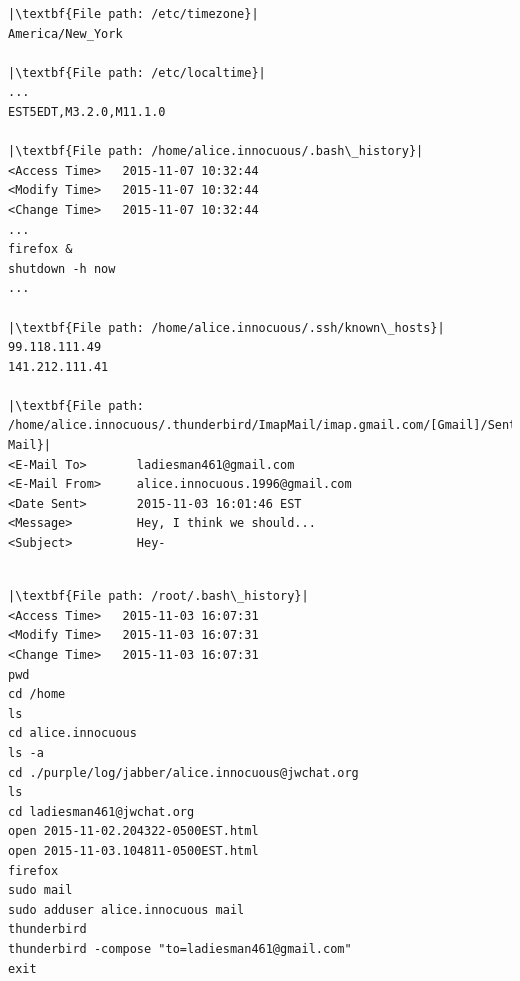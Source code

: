 \documentclass[addpoints]{exam}
\begin{document}
\begin{questions}
\begin{lstlisting}
|\textbf{File path: /etc/timezone}|
America/New_York

|\textbf{File path: /etc/localtime}|
...
EST5EDT,M3.2.0,M11.1.0

|\textbf{File path: /home/alice.innocuous/.bash\_history}|
<Access Time>   2015-11-07 10:32:44
<Modify Time>   2015-11-07 10:32:44
<Change Time>   2015-11-07 10:32:44
...
firefox &
shutdown -h now
...

|\textbf{File path: /home/alice.innocuous/.ssh/known\_hosts}|
99.118.111.49
141.212.111.41

|\textbf{File path: /home/alice.innocuous/.thunderbird/ImapMail/imap.gmail.com/[Gmail]/Sent Mail}|
<E-Mail To>       ladiesman461@gmail.com
<E-Mail From>     alice.innocuous.1996@gmail.com
<Date Sent>       2015-11-03 16:01:46 EST
<Message>         Hey, I think we should...
<Subject>         Hey-           

\end{lstlisting}

\pagebreak

\begin{lstlisting}

|\textbf{File path: /root/.bash\_history}|
<Access Time>   2015-11-03 16:07:31
<Modify Time>   2015-11-03 16:07:31
<Change Time>   2015-11-03 16:07:31
pwd
cd /home
ls
cd alice.innocuous
ls -a
cd ./purple/log/jabber/alice.innocuous@jwchat.org
ls
cd ladiesman461@jwchat.org
open 2015-11-02.204322-0500EST.html
open 2015-11-03.104811-0500EST.html
firefox
sudo mail
sudo adduser alice.innocuous mail
thunderbird
thunderbird -compose "to=ladiesman461@gmail.com"
exit

\end{lstlisting}

\pagebreak

\begin{lstlisting}


\end{lstlisting}
\end{questions}
\end{document}
